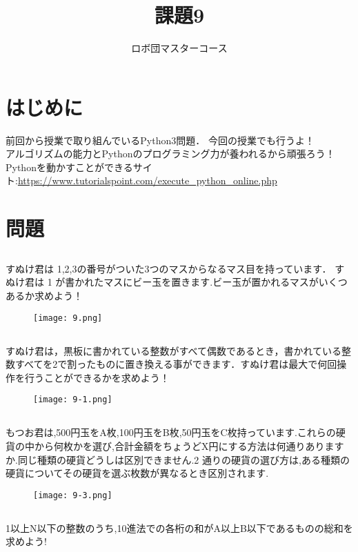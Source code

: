 \documentclass[dvipdfmx]{jsarticle}
\begin{document}
\title{課題9}
\author{ロボ団マスターコース}
\maketitle

\section{はじめに}
前回から授業で取り組んでいるPython3問題．
今回の授業でも行うよ！\\
アルゴリズムの能力とPythonのプログラミング力が養われるから頑張ろう！\\
Pythonを動かすことができるサイト:\url{https://www.tutorialspoint.com/execute_python_online.php}
\section{問題}
\subsection{}
すぬけ君は 1,2,3の番号がついた3つのマスからなるマス目を持っています．
すぬけ君は 1 が書かれたマスにビー玉を置きます.ビー玉が置かれるマスがいくつあるか求めよう！
\begin{figure}[H]
  \centering
  \texttt{[image: 9.png]}
\end{figure}
\subsection{}
すぬけ君は，黒板に書かれている整数がすべて偶数であるとき，書かれている整数すべてを2で割ったものに置き換える事ができます．すぬけ君は最大で何回操作を行うことができるかを求めよう！
\begin{figure}[H]
  \centering
  \texttt{[image: 9-1.png]}
\end{figure}
\subsection{}
もつお君は,500円玉をA枚,100円玉をB枚,50円玉をC枚持っています.これらの硬貨の中から何枚かを選び,合計金額をちょうどX円にする方法は何通りありますか.同じ種類の硬貨どうしは区別できません.2 通りの硬貨の選び方は,ある種類の硬貨についてその硬貨を選ぶ枚数が異なるとき区別されます.
\begin{figure}[H]
  \centering
  \texttt{[image: 9-3.png]}
\end{figure}
\subsection{}
1以上N以下の整数のうち,10進法での各桁の和がA以上B以下であるものの総和を求めよう!
\end{document}
